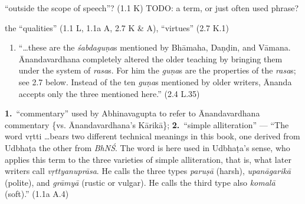 \documentclass[10pt]{article}
\begin{document}
\begin{multicols}{2}
\begin{enumerate}[
			leftmargin=0em,
			rightmargin=0em,
		]
		 ``outside the scope of speech''? (1.1 K) TODO: a term, or just often used phrase?



		 the ``qualities'' (1.1 L, 1.1a A, 2.7 K \& A), ``virtues'' (2.7 K.1)
		\begin{enumerate}
			 ``sweetness'' (2.7 K.1),

			 ``force'' (2.7 K.1),
			``strength'' (2.9 K)

			 ``clarity'' (2.7 K.1),
			``perspicuity'' [K. Kris.\ 2.10 K?, p.???],
			\textbf{NB}: ``[clarity] is a quality common to all \textit{rasa}s'' (2.10 A)

			\item ``\dots these are the \textit{śabdaguṇa}s mentioned by Bhāmaha, Daṇḍin, and Vāmana. Ānanda\-var\-dhana completely altered the older teaching by bringing them under the system of \textit{rasa}s. For him the \textit{guṇa}s are the properties of the \textit{rasa}s; see 2.7 below. Instead of the ten \textit{guṇa}s mentioned by older writers, Ānanda accepts only the three mentioned here.'' (2.4 L.35)
		\end{enumerate}


		 \textbf{1.}\ ``commentary'' used by Abhinavagupta to refer to Ānandavardhana commentary \{vs. Ānanda\-var\-dhana's Kārikā\};
		\textbf{2.}\ ``simple alliteration'' ---
		``The word vṛtti \dots bears two different technical meanings in this book, one derived from Udbhaṭa the other from \textit{BhNŚ}. The word is here used in Udbhaṭa's sense, who applies this term to the three varieties of simple alliteration, that is, what later writers call \textit{vṛttyanuprāsa}. He calls the three types \textit{paruṣā} (harsh), \textit{upanāgarikā} (polite), and \textit{grāmyā} (rustic or vulgar). He calls the third type also \textit{komalā} (soft).'' (1.1a A.4)


\end{enumerate}
\end{multicols}
\end{document}
